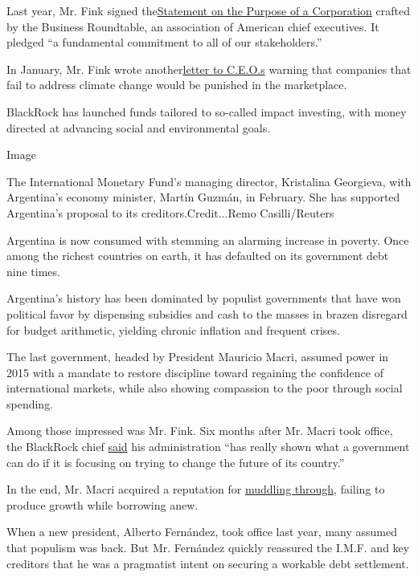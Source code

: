 Last year, Mr. Fink signed
the\href{https://www.nytimes3xbfgragh.onion/2019/08/19/business/business-roundtable-ceos-corporations.html}{Statement
on the Purpose of a Corporation} crafted by the Business Roundtable, an
association of American chief executives. It pledged ``a fundamental
commitment to all of our stakeholders.''

In January, Mr. Fink wrote
another\href{https://www.blackrock.com/corporate/investor-relations/larry-fink-ceo-letter}{letter
to C.E.O.s} warning that companies that fail to address climate change
would be punished in the marketplace.

BlackRock has launched funds tailored to so-called impact investing,
with money directed at advancing social and environmental goals.

Image

The International Monetary Fund's managing director, Kristalina
Georgieva, with Argentina's economy minister, Martín Guzmán, in
February. She has supported Argentina's proposal to its
creditors.Credit...Remo Casilli/Reuters

Argentina is now consumed with stemming an alarming increase in poverty.
Once among the richest countries on earth, it has defaulted on its
government debt nine times.

Argentina's history has been dominated by populist governments that have
won political favor by dispensing subsidies and cash to the masses in
brazen disregard for budget arithmetic, yielding chronic inflation and
frequent crises.

The last government, headed by President Mauricio Macri, assumed power
in 2015 with a mandate to restore discipline toward regaining the
confidence of international markets, while also showing compassion to
the poor through social spending.

Among those impressed was Mr. Fink. Six months after Mr. Macri took
office, the BlackRock chief
\href{https://www.youtube.com/watch?v=TM_MC2Fj-JI}{said} his
administration ``has really shown what a government can do if it is
focusing on trying to change the future of its country.''

In the end, Mr. Macri acquired a reputation for
\href{https://www.nytimes3xbfgragh.onion/2019/05/10/business/argentina-economy-macri-populism.html}{muddling
through}, failing to produce growth while borrowing anew.

When a new president, Alberto Fernández, took office last year, many
assumed that populism was back. But Mr. Fernández quickly reassured the
I.M.F. and key creditors that he was a pragmatist intent on securing a
workable debt settlement.


